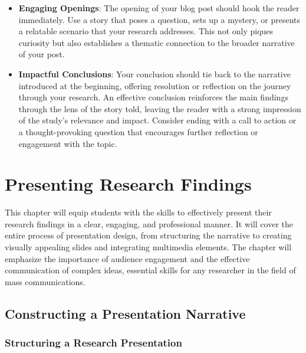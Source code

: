 \documentclass[
]{book}
\begin{document}
\begin{itemize}
\item
  \textbf{Engaging Openings}: The opening of your blog post should hook the reader immediately. Use a story that poses a question, sets up a mystery, or presents a relatable scenario that your research addresses. This not only piques curiosity but also establishes a thematic connection to the broader narrative of your post.
\item
  \textbf{Impactful Conclusions}: Your conclusion should tie back to the narrative introduced at the beginning, offering resolution or reflection on the journey through your research. An effective conclusion reinforces the main findings through the lens of the story told, leaving the reader with a strong impression of the study's relevance and impact. Consider ending with a call to action or a thought-provoking question that encourages further reflection or engagement with the topic.
\end{itemize}

\hypertarget{presenting-research-findings}{%
\chapter{Presenting Research Findings}\label{presenting-research-findings}}

This chapter will equip students with the skills to effectively present their research findings in a clear, engaging, and professional manner. It will cover the entire process of presentation design, from structuring the narrative to creating visually appealing slides and integrating multimedia elements. The chapter will emphasize the importance of audience engagement and the effective communication of complex ideas, essential skills for any researcher in the field of mass communications.

\hypertarget{constructing-a-presentation-narrative}{%
\section*{Constructing a Presentation Narrative}\label{constructing-a-presentation-narrative}}

\hypertarget{structuring-a-research-presentation}{%
\subsection*{Structuring a Research Presentation}\label{structuring-a-research-presentation}}
\end{document}
